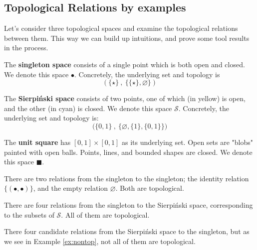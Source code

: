 \documentclass{tufte-handout}
\theoremstyle{definition}
\newtheorem{example}[theorem]{Example}
\begin{document}
\newpage

\begin{fullwidth}

\section{Topological Relations by examples}

Let's consider three topological spaces and examine the topological relations between them. This way we can build up intuitions, and prove some tool results in the process.

The \textbf{singleton space} consists of a single point which is both open and closed. We denote this space $\bullet$. Concretely, the underlying set and topology is
\[(\{\star\} \ , \ \{\{\star\},\varnothing\})\] 

The \textbf{Sierpi\'{n}ski space} consists of two points, one of which (in yellow) is open, and the other (in cyan) is closed. We denote this space $\mathcal{S}$. Concretely, the underlying set and topology is:
\[\big( \{0,1\} \ , \ \{ \varnothing, \{ 1 \} , \{ 0,1\} \} \big)\]

The \textbf{unit square} has $[0,1] \times [0,1]$ as its underlying set.  Open sets are "blobs" painted with open balls. Points, lines, and bounded shapes are closed. We denote this space $\blacksquare$.
\end{fullwidth}

\newthought{$\bullet \rightarrow \bullet$:} There are two relations from the singleton to the singleton; the identity relation $\{ (\bullet,\bullet) \}$, and the empty relation $\varnothing$. Both are topological.

 There are four relations from the singleton to the Sierpi\'{n}ski space, corresponding to the subsets of $\mathcal{S}$. All of them are topological.


There four candidate relations from the Sierpi\'{n}ski space to the singleton, but as we see in Example \ref{ex:nontop}, not all of them are topological.
\end{document}
